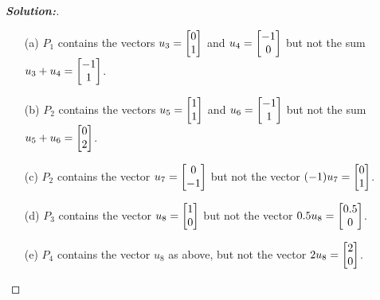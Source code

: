 \documentclass[a4paper]{amsart}
\theoremstyle{definition}
\newenvironment{solution}{\begin{proof}[\textbf{Solution:}] \vphantom{u}}{\end{proof}}
\begin{document}
\begin{solution}
 \begin{itemize}
  \item[(a)] $P_1$ contains the vectors $u_3=\left[\begin{matrix} 0\\1\end{matrix}\right]$ and
   $u_4=\left[\begin{matrix} -1\\0\end{matrix}\right]$ but not the sum $u_3+u_4=\left[\begin{matrix} -1\\1\end{matrix}\right]$.
  \item[(b)] $P_2$ contains the vectors $u_5=\left[\begin{matrix} 1\\1\end{matrix}\right]$ and
   $u_6=\left[\begin{matrix} -1\\1\end{matrix}\right]$ but not the sum $u_5+u_6=\left[\begin{matrix} 0\\2\end{matrix}\right]$.
  \item[(c)] $P_2$ contains the vector $u_7=\left[\begin{matrix} 0\\-1\end{matrix}\right]$ but not
   the vector $(-1)u_7=\left[\begin{matrix} 0\\ 1\end{matrix}\right]$.
  \item[(d)] $P_3$ contains the vector $u_8=\left[\begin{matrix} 1\\0\end{matrix}\right]$ but not the
   vector $0.5u_8=\left[\begin{matrix} 0.5\\0\end{matrix}\right]$.
  \item[(e)] $P_4$ contains the vector $u_8$ as above, but not the
   vector $2u_8=\left[\begin{matrix} 2\\0\end{matrix}\right]$.
 \end{itemize}
\end{solution}
\end{document}
